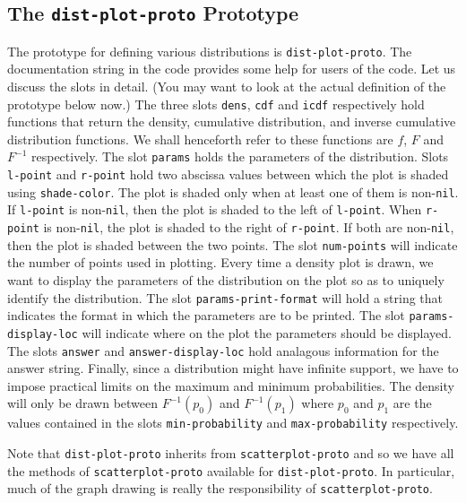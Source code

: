 \subsection{The {\tt{}dist-plot-proto} Prototype}
\label{sec:distproto}
The prototype for defining various distributions is
{\tt{}dist-plot-proto}. The documentation string in the code provides
some help for users of the code. Let us discuss the slots in detail.
(You may want to look at the actual definition of the prototype below
now.)  The three slots {\tt{}dens}, {\tt{}cdf} and {\tt{}icdf} respectively
hold functions that return the density, cumulative distribution, and
inverse cumulative distribution functions.  We shall henceforth refer
to these functions are $f$, $F$ and $F^{-1}$ respectively. The slot
{\tt{}params} holds the parameters of the distribution. Slots {\tt{}l-point}
and {\tt{}r-point} hold two abscissa values between which the plot is
shaded using {\tt{}shade-color}. The plot is shaded only when at least
one of them is non-{\tt{}nil}. If {\tt{}l-point} is non-{\tt{}nil}, then the
plot is shaded to the left of {\tt{}l-point}. When {\tt{}r-point} is
non-{\tt{}nil}, the plot is shaded to the right of {\tt{}r-point}. If both
are non-{\tt{}nil}, then the plot is shaded between the two points. The
slot {\tt{}num-points} will indicate the number of points used in
plotting.  Every time a density plot is drawn, we want to display the
parameters of the distribution on the plot so as to uniquely identify
the distribution.  The slot {\tt{}params-print-format} will hold a string
that indicates the format in which the parameters are to be printed.
The slot {\tt{}params-display-loc} will indicate where on the plot the
parameters should be displayed. The slots {\tt{}answer} and
{\tt{}answer-display-loc} hold analagous information for the answer
string.  Finally, since a distribution might have infinite support, we
have to impose practical limits on the maximum and minimum
probabilities.  The density will only be drawn between $F^{-1}(p_0)$
and $F^{-1}(p_1)$ where $p_0$ and $p_1$ are the values contained in
the slots {\tt{}min-probability} and {\tt{}max-probability} respectively.

Note that {\tt{}dist-plot-proto} inherits from {\tt{}scatterplot-proto} and
so we have all the methods of {\tt{}scatterplot-proto} available for
{\tt{}dist-plot-proto}. In particular, much of the graph drawing is
really the responsibility of {\tt{}scatterplot-proto}. 


